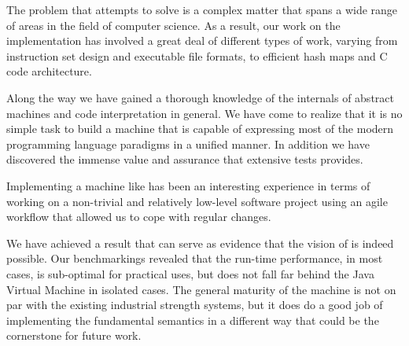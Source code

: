 The problem that \thename{} attempts to solve is a complex matter that spans a
wide range of areas in the field of computer science. As a result, our work on
the implementation has involved a great deal of different types of work, varying
from instruction set design and executable file formats, to efficient hash maps
and C code architecture.

Along the way we have gained a thorough knowledge of the internals of abstract
machines and code interpretation in general. We have come to realize that it is
no simple task to build a machine that is capable of expressing most of the
modern programming language paradigms in a unified manner. In addition we have
discovered the immense value and assurance that extensive tests provides.

Implementing a machine like \thename{} has been an interesting experience in
terms of working on a non-trivial and relatively low-level software project
using an agile workflow that allowed us to cope with regular changes.

We have achieved a result that can serve as evidence that the vision of
\thename{} is indeed possible. Our benchmarkings revealed that the run-time
performance, in most cases, is sub-optimal for practical uses, but does not fall
far behind the Java Virtual Machine in isolated cases. The general maturity of
the machine is not on par with the existing industrial strength systems, but it
does do a good job of implementing the fundamental semantics in a different way
that could be the cornerstone for future work.

